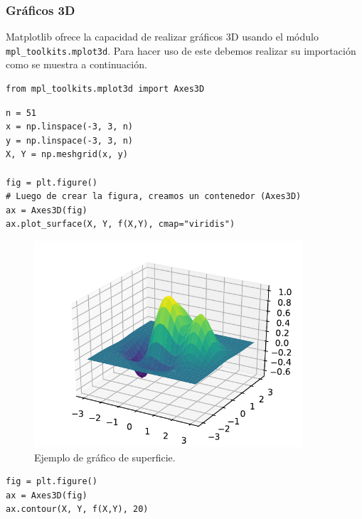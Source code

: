 \subsubsection{Gráficos 3D}

Matplotlib ofrece la capacidad de realizar gráficos 3D usando el módulo
\texttt{mpl\_toolkits.mplot3d}. Para hacer uso de este debemos realizar
su importación como se muestra a continuación.

\begin{listing}[H]
\begin{verbatim}
from mpl_toolkits.mplot3d import Axes3D
\end{verbatim}
\end{listing}

\begin{listing}[H]
\begin{verbatim}
n = 51
x = np.linspace(-3, 3, n)
y = np.linspace(-3, 3, n)
X, Y = np.meshgrid(x, y)

fig = plt.figure()
# Luego de crear la figura, creamos un contenedor (Axes3D)
ax = Axes3D(fig)
ax.plot_surface(X, Y, f(X,Y), cmap="viridis")
\end{verbatim}
\end{listing}

\begin{figure}[H]
	\centering
	\includegraphics[width=10cm]{img/herramientas/grafico_superficie}
	\caption{Ejemplo de gráfico de superficie.}
	\label{fig:grafico_superficie}
\end{figure}

\begin{listing}[H]
\begin{verbatim}
fig = plt.figure()
ax = Axes3D(fig)
ax.contour(X, Y, f(X,Y), 20)
\end{verbatim}
\end{listing}

